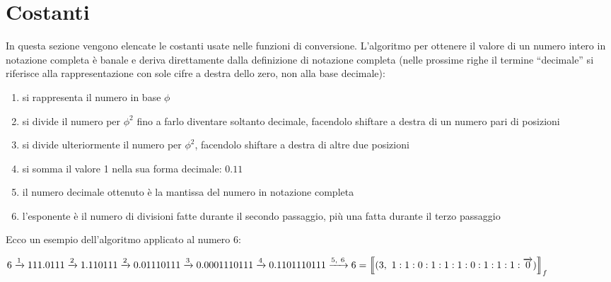 \documentclass[Lau,oneside]{sapthesis}
\begin{document}
\section{Costanti}\label{costanti}
In questa sezione vengono elencate le costanti usate nelle funzioni di conversione. L'algoritmo per ottenere il valore di un numero intero in notazione completa è banale e deriva direttamente dalla definizione di notazione completa (nelle prossime righe il termine ``decimale'' si riferisce alla rappresentazione con sole cifre a destra dello zero, non alla base decimale):\\
\begin{enumerate}[(1)]
\item si rappresenta il numero in base $\phi$\\
\item si divide il numero per $\phi^2$ fino a farlo diventare soltanto decimale, facendolo shiftare a destra di un numero pari di posizioni\\
\item si divide ulteriormente il numero per $\phi^2$, facendolo shiftare a destra di altre due posizioni\\
\item si somma il valore 1 nella sua forma decimale: $0.11$\\
\item il numero decimale ottenuto è la mantissa del numero in notazione completa\\
\item l'esponente è il numero di divisioni fatte durante il secondo passaggio, più una fatta durante il terzo passaggio
\end{enumerate}
Ecco un esempio dell'algoritmo applicato al numero 6:
\begin{center}
$6 \xrightarrow{1} 111.0111 \xrightarrow{2} 1.110111 \xrightarrow{2} 0.01110111  \xrightarrow{3} 0.0001110111 \xrightarrow{4} 0.1101110111 \xrightarrow{5, \ 6} \newline\newline
6 = \left\llbracket (3, \ 1:1:0:1:1:1:0:1:1:1:\overrightarrow{0}) \right\rrbracket_f$
\end{center}
\end{document}
